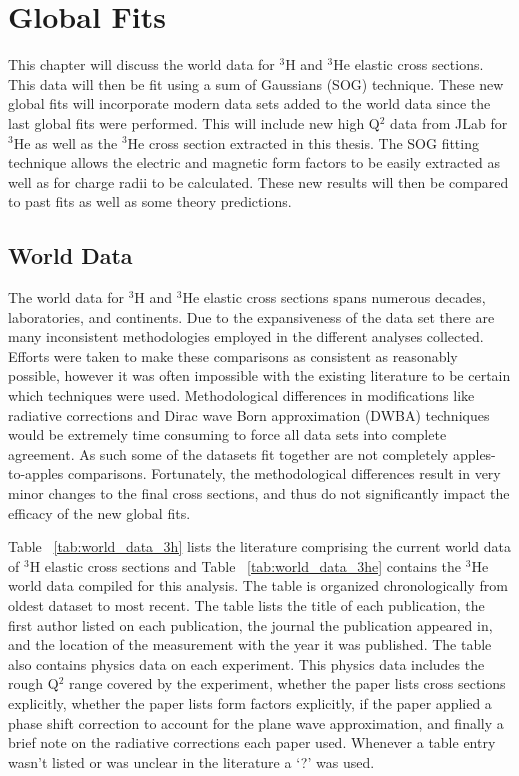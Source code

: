 \chapter{Global Fits} %
\label{ch:global_fits} %

This chapter will discuss the world data for $^3$H and $^3$He elastic cross sections. This data will then be fit using a sum of Gaussians (SOG) technique. These new global fits will incorporate modern data sets added to the world data since the last global fits were performed. This will include new high Q$^2$ data from JLab for $^3$He as well as the $^3$He cross section extracted in this thesis. The SOG fitting technique allows the electric and magnetic form factors to be easily extracted as well as for charge radii to be calculated. These new results will then be compared to past fits as well as some theory predictions.

\section{World Data}
\label{sec:world_data}

The world data for $^3$H and $^3$He elastic cross sections spans numerous decades, laboratories, and continents. Due to the expansiveness of the data set there are many inconsistent methodologies employed in the different analyses collected. Efforts were taken to make these comparisons as consistent as reasonably possible, however it was often impossible with the existing literature to be certain which techniques were used. Methodological differences in modifications like radiative corrections and Dirac wave Born approximation (DWBA) techniques would be extremely time consuming to force all data sets into complete agreement. As such some of the datasets fit together are not completely apples-to-apples comparisons. Fortunately, the methodological differences result in very minor changes to the final cross sections, and thus do not significantly impact the efficacy of the new global fits.

Table ~\ref{tab:world_data_3h} lists the literature comprising the current world data of $^3$H elastic cross sections and Table ~\ref{tab:world_data_3he} contains the $^3$He world data compiled for this analysis. The table is organized chronologically from oldest dataset to most recent. The table lists the title of each publication, the first author listed on each publication, the journal the publication appeared in, and the location of the measurement with the year it was published. The table also contains physics data on each experiment. This physics data includes the rough Q$^2$ range covered by the experiment, whether the paper lists cross sections explicitly, whether the paper lists form factors explicitly, if the paper applied a phase shift correction to account for the plane wave approximation, and finally a brief note on the radiative corrections each paper used. Whenever a table entry wasn't listed or was unclear in the literature a `?' was used.
 

